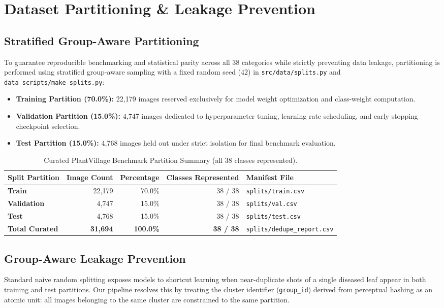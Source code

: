 \section{Dataset Partitioning \& Leakage Prevention}
\label{sec:splits}

\subsection{Stratified Group-Aware Partitioning}
To guarantee reproducible benchmarking and statistical parity across all 38 categories while strictly preventing data leakage, partitioning is performed using stratified group-aware sampling with a fixed random seed ($42$) in \texttt{src/data/splits.py} and \texttt{data\_scripts/make\_splits.py}:
\begin{itemize}
    \item \textbf{Training Partition (70.0\%):} 22,179 images reserved exclusively for model weight optimization and class-weight computation.
    \item \textbf{Validation Partition (15.0\%):} 4,747 images dedicated to hyperparameter tuning, learning rate scheduling, and early stopping checkpoint selection.
    \item \textbf{Test Partition (15.0\%):} 4,768 images held out under strict isolation for final benchmark evaluation.
\end{itemize}

\begin{table}[htbp]
\centering
\small
\caption{Curated PlantVillage Benchmark Partition Summary (all 38 classes represented).}
\label{tab:pv_splits}
\begin{tabular}{lrrrl}
\toprule
\textbf{Split Partition} & \textbf{Image Count} & \textbf{Percentage} & \textbf{Classes Represented} & \textbf{Manifest File} \\
\midrule
\textbf{Train} & 22,179 & 70.0\% & 38 / 38 & \texttt{splits/train.csv} \\
\textbf{Validation} & 4,747 & 15.0\% & 38 / 38 & \texttt{splits/val.csv} \\
\textbf{Test} & 4,768 & 15.0\% & 38 / 38 & \texttt{splits/test.csv} \\
\midrule
\textbf{Total Curated} & \textbf{31,694} & \textbf{100.0\%} & \textbf{38 / 38} & \texttt{splits/dedupe\_report.csv} \\
\bottomrule
\end{tabular}
\end{table}

\subsection{Group-Aware Leakage Prevention}
Standard naive random splitting exposes models to shortcut learning when near-duplicate shots of a single diseased leaf appear in both training and test partitions. Our pipeline resolves this by treating the cluster identifier (\texttt{group\_id}) derived from perceptual hashing as an atomic unit: all images belonging to the same cluster are constrained to the same partition.

